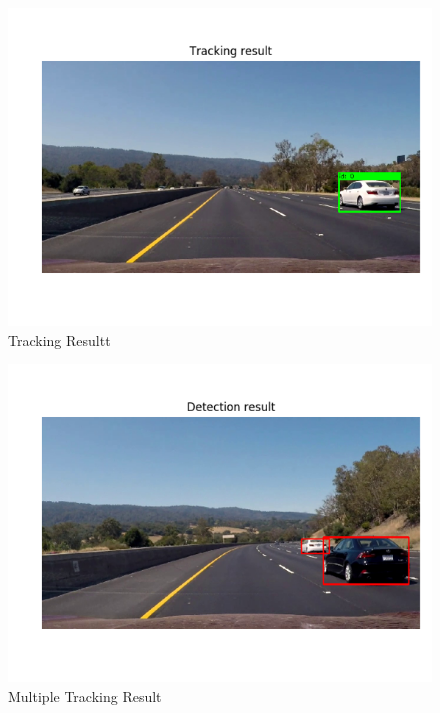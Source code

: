 \documentclass[10pt,twocolumn,letterpaper]{article}
\begin{document}
\begin{figure}[h]
\begin{center}
   \includegraphics[width=1\linewidth]{__3.png}
\end{center}
   \caption{Tracking Resultt}
\label{fig:4_3}
\end{figure}

\begin{figure}[h]
\begin{center}
   \includegraphics[width=1\linewidth]{__4.png}
\end{center}
   \caption{Multiple Tracking Result}
\label{fig:4_4}
\end{figure}
\end{document}

